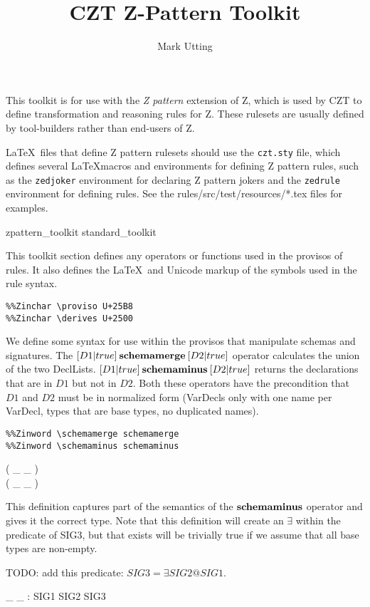 \documentclass[10pt]{article}
\title{CZT Z-Pattern Toolkit}
\author{Mark Utting}
\begin{document}
\maketitle

This toolkit is for use with the \emph{Z pattern} extension of Z,
which is used by CZT to define transformation and reasoning rules
for Z.  These rulesets are usually defined by tool-builders rather
than end-users of Z.

\LaTeX\ files that define Z pattern rulesets should use the
\verb!czt.sty! file, which defines several \LaTeX macros and
environments for defining Z pattern rules, such as 
the \verb!zedjoker! environment for declaring
Z pattern jokers and the \verb!zedrule! environment for defining
rules.  See the rules/src/test/resources/*.tex files for examples.

\begin{zsection}
  \SECTION zpattern\_toolkit \parents standard\_toolkit
\end{zsection}

This toolkit section defines any operators or functions used in the
provisos of rules.  It also defines the \LaTeX\ and Unicode markup of
the symbols used in the rule syntax.

\begin{verbatim}
%%Zinchar \proviso U+25B8
%%Zinchar \derives U+2500
\end{verbatim}

We define some syntax for use within the provisos that manipulate
schemas and signatures.  The $[D1|true] \mathbin{\textbf{schemamerge}} [D2|true]$
operator calculates the union of the two DeclLists. 
$[D1|true] \mathbin{\textbf{schemaminus}} [D2|true]$ returns the declarations that are in
$D1$ but not in $D2$.  Both these operators have the precondition that
$D1$ and $D2$ must be in normalized form (VarDecls only with one name
per VarDecl, types that are base types, no duplicated names).

\begin{verbatim}
%%Zinword \schemamerge schemamerge
%%Zinword \schemaminus schemaminus
\end{verbatim}

\begin{zed}
   \leftassoc ( \_ \schemamerge \_ ) \\
   \leftassoc ( \_ \schemaminus \_ )
\end{zed}


This definition captures part of the semantics of
the $\mathbin{\textbf{schemaminus}}$ operator and gives it the correct
type.  Note that this definition will create an $\exists$
within the predicate of SIG3, but that exists will be
trivially true if we assume that all base types are non-empty. 

TODO: add this predicate: $SIG3 = \exists SIG2 @ SIG1$.

\begin{gendef}
  \_ \schemaminus \_ : SIG1 \cross SIG2 \fun SIG3
\end{gendef}
\end{document}
